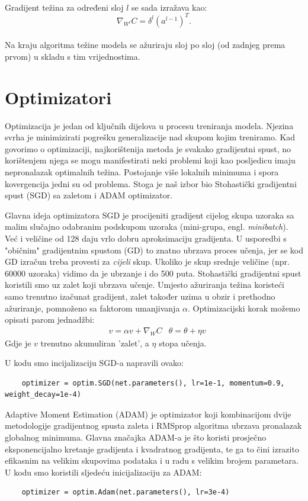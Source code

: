 		\noindent\\Gradijent težina za određeni sloj \(l\) se sada izražava kao:
		\[\nabla _{W^{l}}C=\delta ^{l}(a^{l-1})^{T}.\]
		\noindent\\Na kraju algoritma težine modela se ažuriraju sloj po sloj (od zadnjeg prema prvom) u skladu s tim vrijednostima.  


\section{Optimizatori}

Optimizacija je jedan od ključnih dijelova u procesu treniranja modela. Njezina svrha je minimizirati pogrešku generalizacije nad skupom kojim treniramo.
Kad govorimo o optimizaciji, najkorištenija metoda je svakako gradijentni spust, no korištenjem njega se mogu manifestirati neki problemi koji kao posljedicu imaju nepronalazak optimalnih težina. Postojanje više lokalnih minimuma i spora kovergencija jedni su od problema. Stoga je naš izbor bio Stohastički gradijentni spust \cite{sgd} (SGD) sa zaletom i ADAM \cite{adam} optimizator. 

Glavna ideja optimizatora SGD je procijeniti gradijent cijelog skupa uzoraka sa malim slučajno odabranim podskupom uzoraka (mini-grupa, engl. \textit{minibatch}). Već i veličine od 128 daju vrlo dobru aproksimaciju gradijenta. U usporedbi s "običnim" gradijentnim spustom (GD) to znatno ubrzava proces učenja, jer se kod GD izračun treba provesti za \textit{cijeli} skup. Ukoliko je skup srednje veličine (npr. 60000 uzoraka) vidimo da je ubrzanje i do 500 puta.  Stohastički gradijentni spust koristili smo uz zalet koji ubrzava učenje. Umjesto ažuriranja težina koristeći samo trenutno izačunat gradijent, zalet također uzima u obzir i prethodno ažuriranje, pomnoženo sa faktorom umanjivanja $\alpha$. Optimizacijski korak možemo opisati parom jednadžbi:
\begin{align}
& v = \alpha v + \nabla_W C 
& \theta = \theta + \eta v
\end{align}
Gdje je $v$ trenutno akumuliran 'zalet', a $\eta$ stopa učenja.

 
U kodu smo incijalizaciju SGD-a napravili ovako:

\begin{verbatim}
	optimizer = optim.SGD(net.parameters(), lr=1e-1, momentum=0.9, weight_decay=1e-4)
\end{verbatim}

Adaptive Moment Estimation (ADAM) je optimizator koji kombinacijom dvije metodologije gradijentnog spusta zaleta i RMSprop algoritma ubrzava pronalazak globalnog minimuma. Glavna značajka ADAM-a je što koristi prosječno eksponencijalno kretanje gradijenta i kvadratnog gradijenta, te ga to čini izrazito efikasnim na velikim skupovima podataka i u radu s velikim brojem parametara. U kodu smo koristili sljedeću inicijalizaciju za ADAM:

\begin{verbatim}
	optimizer = optim.Adam(net.parameters(), lr=3e-4)
\end{verbatim}